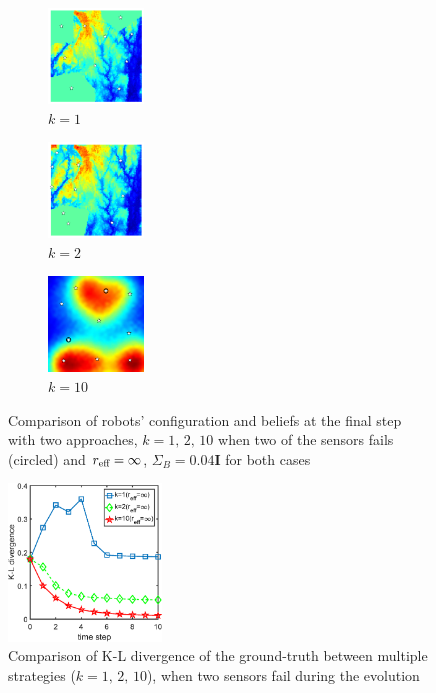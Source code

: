 \documentclass[letterpaper, 10 pt, conference]{ieeeconf}
\begin{document}
\begin{figure}
	\centering
	\begin{subfigure}[b]{0.15\textwidth}
		\centering
		\includegraphics[width=1in]{figure/k_1}
		\caption{$k=1$}
	\end{subfigure}
	\begin{subfigure}[b]{0.15\textwidth}
		\centering
		\includegraphics[width=1in]{figure/k_2}
		\caption{$k=2$}
	\end{subfigure}
	\begin{subfigure}[b]{0.15\textwidth}
	\centering
	\includegraphics[width=1in]{figure/fault_order_n_c}
	\caption{$k=10$}
\end{subfigure}
	\caption{Comparison of robots' configuration and beliefs at the final step with two approaches, $k=1, \,2,\,10$ when two of the sensors fails (circled) and $r_{\textup{eff}}=\infty$, $\Sigma_B = 0.04\mathbf{I}$ for both cases }
	\label{fig:fig6}
\end{figure}
\begin{figure}
	\centering
	\includegraphics[width=1.6in]{figure/fault_kl2}
	\caption{Comparison of K-L divergence of the ground-truth between multiple strategies ($k=1,\,2,\,10$), when two sensors fail during the evolution}
	\label{fig:fig7}
\end{figure}
\end{document}
